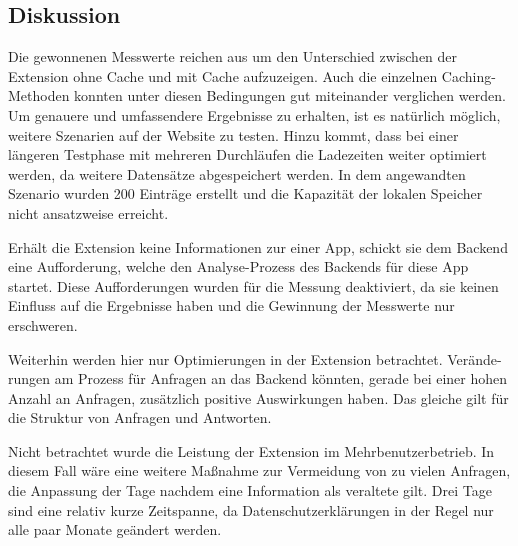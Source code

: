 \subsection{Diskussion}
\label{ss:diskussionht2}

Die gewonnenen Messwerte reichen aus um den Unterschied zwischen der Extension ohne Cache und mit Cache aufzuzeigen. Auch die einzelnen Caching-Methoden konnten unter diesen Bedingungen gut miteinander verglichen werden. Um genauere und umfassendere Ergebnisse zu erhalten, ist es natürlich möglich, weitere Szenarien auf der Website zu testen. Hinzu kommt, dass bei einer längeren Testphase mit mehreren Durchläufen die Ladezeiten weiter optimiert werden, da weitere Datensätze abgespeichert werden. In dem angewandten Szenario wurden 200 Einträge erstellt und die Kapazität der lokalen Speicher nicht ansatzweise erreicht.

Erhält die Extension keine Informationen zur einer App, schickt sie dem Backend eine Aufforderung, welche den Analyse-Prozess des Backends für diese App startet. Diese Aufforderungen wurden für die Messung deaktiviert, da sie keinen Einfluss auf die Ergebnisse haben und die Gewinnung der Messwerte nur erschweren.

Weiterhin werden hier nur Optimierungen in der Extension betrachtet. Verände-rungen am Prozess für Anfragen an das Backend könnten, gerade bei einer hohen Anzahl an Anfragen, zusätzlich positive Auswirkungen haben. Das gleiche gilt für die Struktur von Anfragen und Antworten.

Nicht betrachtet wurde die Leistung der Extension im Mehrbenutzerbetrieb. In diesem Fall wäre eine weitere Maßnahme zur Vermeidung von zu vielen Anfragen, die Anpassung der Tage nachdem eine Information als veraltete gilt. Drei Tage sind eine relativ kurze Zeitspanne, da Datenschutzerklärungen in der Regel nur alle paar Monate geändert werden.